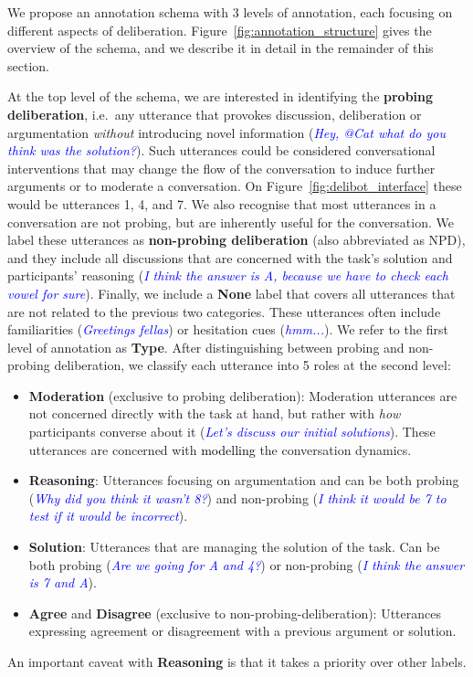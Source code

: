 \documentclass[acmsmall,manuscript,screen]{acmart}
\newcommand\example[1]{(\textcolor{blue}{\textit{#1}})}
\newcommand\newtext[1]{\textcolor{black}{#1}}
\begin{document}
We propose an annotation schema with 3 levels of annotation, each focusing on different aspects of deliberation.
Figure~\ref{fig:annotation_structure} gives the overview of the schema, and we describe it in detail in the remainder of this section.

At the top level of the schema, we are interested in identifying the \textbf{probing deliberation}, i.e.\ any utterance that provokes discussion, deliberation or argumentation \textit{without} introducing novel information \example{Hey, @Cat what do you think was the solution?}. 
Such utterances could be considered conversational interventions that may change the flow of the conversation to induce further arguments or to moderate a conversation. On Figure~\ref{fig:delibot_interface} these would be utterances 1, 4, and 7.
We also recognise that most utterances in a conversation are not probing, but are inherently useful for the conversation. We label these utterances as \textbf{non-probing deliberation} (also abbreviated as NPD), and they include all discussions that are concerned with the task's solution and participants' reasoning \example{I think the answer is A, because we have to check each vowel for sure}. 
Finally, we include a \textbf{None} label that covers all utterances that are not related to the previous two categories. These utterances often include familiarities \example{Greetings fellas} or hesitation cues \example{hmm...}.
We refer to the first level of annotation as \textbf{Type}. After distinguishing between probing and non-probing deliberation, we classify each utterance into 5 roles at the second level:
\begin{itemize}[noitemsep,nolistsep]
\item \textbf{Moderation} (exclusive to probing deliberation): Moderation utterances are not concerned directly with the task at hand, but rather with \textit{how} participants converse about it \example{Let's discuss our initial solutions}. These utterances 
are concerned with \newtext{modelling} the conversation dynamics.
\item \textbf{Reasoning}: Utterances focusing on argumentation and can be both probing \example{Why did you think it wasn't 8?} and non-probing  \example{I think it would be 7 to test if it would be incorrect}. 
\item \textbf{Solution}: Utterances that are managing the solution of the task. Can be both probing \example{Are we going for A and 4?} or non-probing  \example{I think the answer is 7 and A}. 
\item \textbf{Agree} and \textbf{Disagree} (exclusive to non-probing-deliberation): Utterances expressing agreement or disagreement with a previous argument or solution. 
\end{itemize}
An important caveat with \textbf{Reasoning} is that it takes a priority over other labels. 
\end{document}
